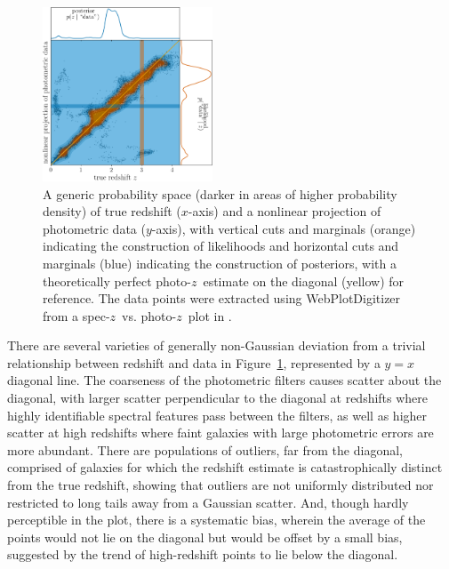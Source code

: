 \documentclass[iop]{emulateapj}
\newcommand{\todo}[3]{{\color{#2}\emph{#1}: #3}}
\newcommand{\aim}[1]{\todo{AIM}{red}{#1}}
\newcommand{\sz}{spec-$z$}
\newcommand{\pz}{photo-$z$}
\begin{document}
\begin{figure}
	\begin{center}
		\includegraphics[width=0.45\textwidth]{figures/jain05.png}
		\caption{
			A generic probability space (darker in areas of higher probability density) of true redshift ($x$-axis) and a nonlinear projection of photometric data ($y$-axis), with vertical cuts and marginals (orange) indicating the construction of likelihoods and horizontal cuts and marginals (blue) indicating the construction of posteriors, with a theoretically perfect \pz\ estimate on the diagonal (yellow) for reference.
			The data points were extracted using WebPlotDigitizer \citep{rohatgi_webplotdigitizer_2019} from a \sz\ vs. \pz\ plot in \citet{jain_whole_2015}.
		}
		\label{fig:pedagogical_scatter}
	\end{center}
\end{figure}

There are several varieties of generally non-Gaussian deviation from a trivial relationship between redshift and data in Figure~\ref{fig:pedagogical_scatter}, represented by a $y = x$ diagonal line.
The coarseness of the photometric filters causes scatter about the diagonal, with larger scatter perpendicular to the diagonal at redshifts where highly identifiable spectral features pass between the filters, as well as higher scatter at high redshifts where faint galaxies with large photometric errors are more abundant.
There are populations of outliers, far from the diagonal, comprised of galaxies for which the redshift estimate is catastrophically distinct from the true redshift, showing that outliers are not uniformly distributed nor restricted to long tails away from a Gaussian scatter.
And, though hardly perceptible in the plot, there is a systematic bias, wherein the average of the points would not lie on the diagonal but would be offset by a small bias, suggested by the trend of high-redshift points to lie below the diagonal.
\end{document}
